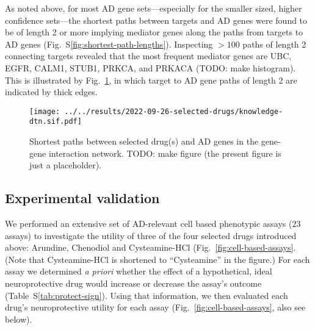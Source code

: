 \documentclass[letterpaper]{article}
\begin{document}
As noted above, for most AD gene sets---especially for the smaller sized,
higher confidence sets---the shortest paths between targets and AD genes were
found to be of length 2 or more implying mediator genes along the paths from
targets to AD genes (Fig.~S\ref{fig:shortest-path-lengths}).  Inspecting
$>100$ paths of length 2 connecting targets revealed that the most frequent mediator genes
are UBC, EGFR, CALM1, STUB1, PRKCA, and PRKACA (TODO: make histogram).
This is illustrated by Fig.~\ref{fig:drug-AD-genes-network}, in which
target to AD gene paths of length 2 are indicated by thick edges.

\begin{figure}
\texttt{[image: ../../results/2022-09-26-selected-drugs/knowledge-dtn.sif.pdf]}
  \caption{Shortest paths between selected drug(s) and AD genes in the
    gene-gene interaction network.  TODO: make figure (the present figure is
    just a placeholder).
}
\label{fig:drug-AD-genes-network}
\end{figure}

\subsection{Experimental validation}

We performed an extensive set of AD-relevant cell based phenotypic assays
($23$ assays) to investigate the utility of three of the four selected drugs
introduced above: Arundine, Chenodiol and Cysteamine-HCl
(Fig.~\ref{fig:cell-based-assays}.  (Note that Cysteamine-HCl is shortened to
``Cysteamine'' in the figure.)  For each assay we determined \emph{a priori}
whether the effect of a hypothetical, ideal neuroprotective drug would
increase or decrease the assay's outcome (Table~S\ref{tab:protect-sign}).
Using that information, we then evaluated each drug's neuroprotective utility
for each assay (Fig.~\ref{fig:cell-based-assays}, also see below).
\end{document}
